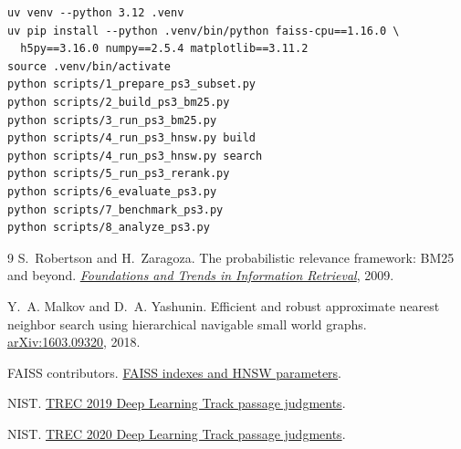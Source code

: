 \documentclass[11pt,letterpaper]{article}
\begin{document}
{\footnotesize
\begin{verbatim}
uv venv --python 3.12 .venv
uv pip install --python .venv/bin/python faiss-cpu==1.16.0 \
  h5py==3.16.0 numpy==2.5.4 matplotlib==3.11.2
source .venv/bin/activate
python scripts/1_prepare_ps3_subset.py
python scripts/2_build_ps3_bm25.py
python scripts/3_run_ps3_bm25.py
python scripts/4_run_ps3_hnsw.py build
python scripts/4_run_ps3_hnsw.py search
python scripts/5_run_ps3_rerank.py
python scripts/6_evaluate_ps3.py
python scripts/7_benchmark_ps3.py
python scripts/8_analyze_ps3.py
\end{verbatim}
}

\begin{thebibliography}{9}\footnotesize
\setlength{\itemsep}{1pt}
\setlength{\parskip}{0pt}
S.~Robertson and H.~Zaragoza.
\newblock The probabilistic relevance framework: BM25 and beyond.
\newblock \href{https://doi.org/10.1561/1500000019}{\emph{Foundations and Trends in Information Retrieval}}, 2009.

Y.~A. Malkov and D.~A. Yashunin.
\newblock Efficient and robust approximate nearest neighbor search using hierarchical navigable small world graphs.
\newblock \href{https://arxiv.org/abs/1603.09320}{arXiv:1603.09320}, 2018.

FAISS contributors.
\newblock \href{https://github.com/facebookresearch/faiss/wiki/Faiss-indexes}{FAISS indexes and HNSW parameters}.

NIST.
\newblock \href{https://trec.nist.gov/data/deep2019.html}{TREC 2019 Deep Learning Track passage judgments}.

NIST.
\newblock \href{https://trec.nist.gov/data/deep2020.html}{TREC 2020 Deep Learning Track passage judgments}.
\end{thebibliography}
\end{document}
